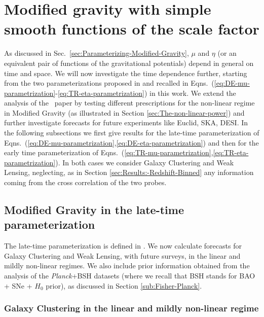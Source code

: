 \section{Modified gravity with simple smooth functions of the scale factor}

As discussed in Sec.\ \ref{sec:Parameterizing-Modified-Gravity}, $\mu$ and $\eta$ (or an equivalent pair of functions of the gravitational potentials) depend in general on time and space. We will now investigate the time dependence further, starting from the two parameterizations proposed in \cite{planck_collaboration_planck_2016} and recalled in Eqns.\ (\ref{eq:DE-mu-parametrization}-\ref{eq:TR-eta-parametrization}) in this work. We extend the analysis of the \planck\ paper by testing different prescriptions for the non-linear regime in Modified Gravity (as illustrated in Section \ref{sec:The-non-linear-power}) and further investigate forecasts for future experiments like Euclid, SKA, DESI. In the following subsections we first give results for the late-time parameterization of Eqns.\ (\ref{eq:DE-mu-parametrization},\ref{eq:DE-eta-parametrization}) and then for the early time parameterization of Eqns.\ (\ref{eq:TR-mu-parametrization},\ref{eq:TR-eta-parametrization}). In both cases we consider Galaxy Clustering and Weak Lensing, neglecting, as in Section \ref{sec:Results:-Redshift-Binned} any information coming from the cross correlation of the two probes.

\subsection{\label{sub:MG-DE}Modified Gravity in the late-time parameterization}

The late-time parameterization is defined in  . We now calculate forecasts for Galaxy Clustering and Weak Lensing, with future surveys, in the linear and mildly non-linear regimes.
We also include prior information obtained from
the analysis of the {\it Planck}+BSH datasets (where we recall that BSH stands for BAO + SNe + $H_0$ prior),
as discussed in Section \ref{sub:Fisher-Planck}.

\subsubsection{Galaxy Clustering in the linear and mildly non-linear regime}

